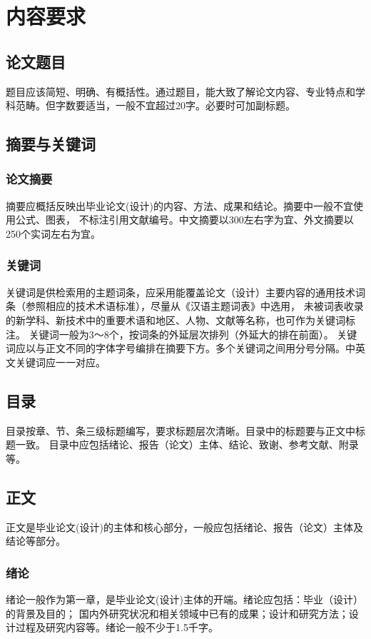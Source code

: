 \section{内容要求}
\label{section:optimizations}
\subsection{论文题目}
    题目应该简短、明确、有概括性。通过题目，能大致了解论文内容、专业特点和学科范畴。但字数要适当，一般不宜超过20字。必要时可加副标题。
\subsection{摘要与关键词}
    \subsubsection{论文摘要}
        摘要应概括反映出毕业论文(设计)的内容、方法、成果和结论。摘要中一般不宜使用公式、图表，
        不标注引用文献编号。中文摘要以300左右字为宜、外文摘要以250个实词左右为宜。
    \subsubsection{关键词}
        关键词是供检索用的主题词条，应采用能覆盖论文（设计）主要内容的通用技术词条（参照相应的技术术语标准），尽量从《汉语主题词表》中选用，
        未被词表收录的新学科、新技术中的重要术语和地区、人物、文献等名称，也可作为关键词标注。
        关键词一般为3～8个，按词条的外延层次排列（外延大的排在前面）。
        关键词应以与正文不同的字体字号编排在摘要下方。多个关键词之间用分号分隔。中英文关键词应一一对应。
\subsection{目录}
    目录按章、节、条三级标题编写，要求标题层次清晰。目录中的标题要与正文中标题一致。
    目录中应包括绪论、报告（论文）主体、结论、致谢、参考文献、附录等。
\subsection{正文}
    正文是毕业论文(设计)的主体和核心部分，一般应包括绪论、报告（论文）主体及结论等部分。
    \subsubsection{绪论}
        绪论一般作为第一章，是毕业论文(设计)主体的开端。绪论应包括：毕业（设计）的背景及目的；
        国内外研究状况和相关领域中已有的成果；设计和研究方法；设计过程及研究内容等。绪论一般不少于1.5千字。
